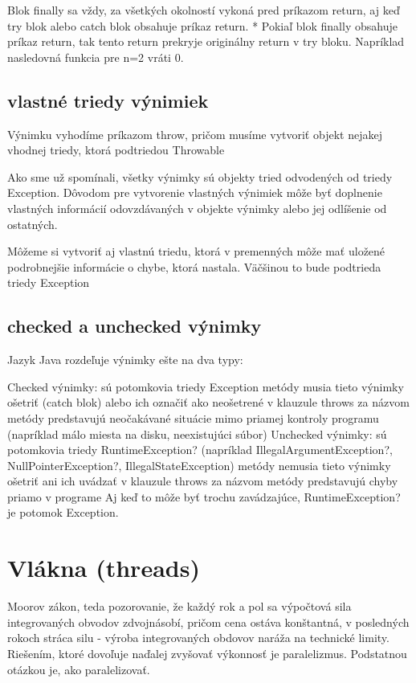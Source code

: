 Blok finally sa vždy, za všetkých okolností vykoná pred príkazom return, aj keď try blok alebo catch blok obsahuje príkaz return. * Pokiaľ blok finally obsahuje príkaz return, tak tento return prekryje originálny return v try bloku. Napríklad nasledovná funkcia pre n=2 vráti 0.

	\subsection{vlastné triedy výnimiek}
	Výnimku vyhodíme príkazom throw, pričom musíme vytvoriť objekt nejakej vhodnej triedy, ktorá podtriedou Throwable



Ako sme už spomínali, všetky výnimky sú objekty tried odvodených od triedy Exception. Dôvodom pre vytvorenie vlastných výnimiek môže byť doplnenie vlastných informácií odovzdávaných v objekte výnimky alebo jej odlíšenie od ostatných.

	Môžeme si vytvoriť aj vlastnú triedu, ktorá v premenných môže mať uložené podrobnejšie informácie o chybe, ktorá nastala.
	Väčšinou to bude podtrieda triedy Exception




	\subsection{checked a unchecked výnimky}
Jazyk Java rozdeľuje výnimky ešte na dva typy:

Checked výnimky:
sú potomkovia triedy Exception
metódy musia tieto výnimky ošetriť (catch blok) alebo ich označiť ako neošetrené v klauzule throws za názvom metódy
predstavujú neočakávané situácie mimo priamej kontroly programu (napríklad málo miesta na disku, neexistujúci súbor)
Unchecked výnimky:
sú potomkovia triedy RuntimeException? (napríklad IllegalArgumentException?, NullPointerException?, IllegalStateException)
metódy nemusia tieto výnimky ošetriť ani ich uvádzať v klauzule throws za názvom metódy
predstavujú chyby priamo v programe
Aj keď to môže byť trochu zavádzajúce, RuntimeException? je potomok Exception.



\section{Vlákna (threads)}


	Moorov zákon, teda pozorovanie, že každý rok a pol sa výpočtová sila integrovaných obvodov zdvojnásobí, pričom cena ostáva konštantná, v posledných rokoch stráca silu - výroba integrovaných obdovov naráža na technické limity. Riešením, ktoré dovoľuje naďalej zvyšovať výkonnosť je paralelizmus. Podstatnou otázkou je, ako paralelizovať.

